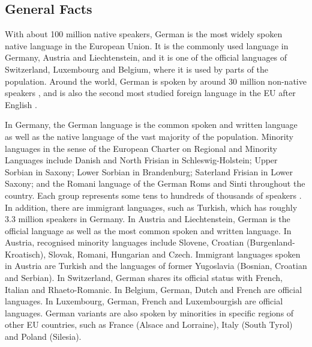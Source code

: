\documentclass[]{../../metanetpaper}
\begin{document}
\clearpage


\begin{multicols}{2}

\subsection{General Facts}

With about 100 million native speakers, German is the most widely spoken native language in the European Union. It is the commonly used language in Germany, Austria and Liechtenstein, and it is one of the official languages of Switzerland, Luxembourg and Belgium, where it is used by parts of the population. Around the world, German is spoken by around 30 million non-native speakers \cite{Eur1}, and is also the second most studied foreign language in the EU after English \cite{Goe1}. 

In Germany, the German language is the common spoken and written language as well as the native language of the vast majority of the population. Minority languages in the sense of the European Charter on Regional and Minority Languages include Danish and North Frisian in Schleswig-Holstein; Upper Sorbian in Saxony; Lower Sorbian in Brandenburg; Saterland Frisian in Lower Saxony; and the Romani language of the German Roms and Sinti throughout the country. Each group represents some tens to hundreds of thousands of speakers \cite{Efni1}. In addition, there are immigrant languages, such as Turkish, which has roughly 3.3 million speakers in Germany.
In Austria and Liechtenstein, German is the official language as well as the most common spoken and written language. In Austria, recognised minority languages include Slovene, Croatian (Burgenland-Kroatisch), Slovak, Romani, Hungarian and Czech. Immigrant languages spoken in Austria are Turkish and the languages of former Yugoslavia (Bosnian, Croatian and Serbian).
In Switzerland, German shares its official status with French, Italian and Rhaeto-Romanic. In Belgium, German, Dutch and French are official languages. In Luxembourg, German, French and Luxembourgish are official languages. German variants are also spoken by minorities in specific regions of other EU countries, such as France (Alsace and Lorraine), Italy (South Tyrol) and Poland (Silesia).


\end{multicols}
\end{document}
